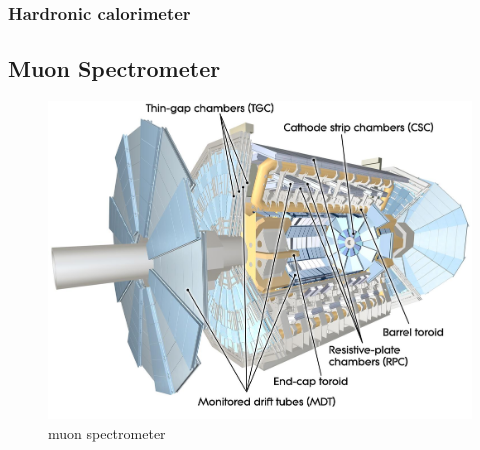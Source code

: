 \subsubsection{Hardronic calorimeter}

\subsection{Muon Spectrometer}
\begin{figure}
\centering
\includegraphics[width=\textwidth]{data/photo/muon_spectrometer.jpg}
\caption{muon spectrometer \cite{muon_spectrometer}}
\label{fig:muon_spectrometer}
\end{figure}
